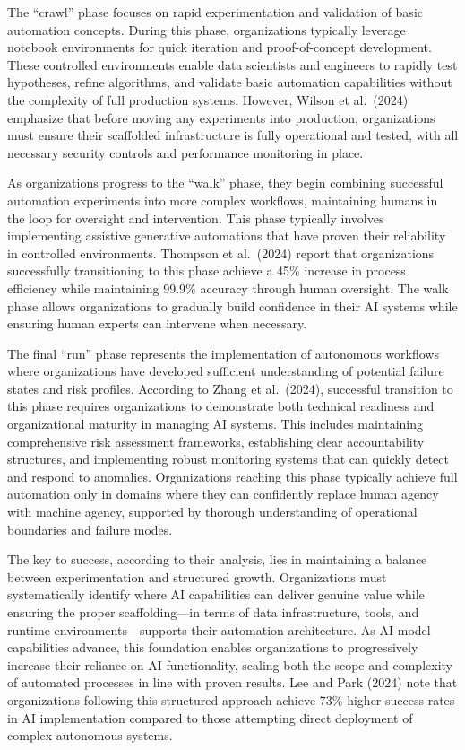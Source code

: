 \documentclass[
]{article}
\begin{document}
The ``crawl'' phase focuses on rapid experimentation and validation of
basic automation concepts. During this phase, organizations typically
leverage notebook environments for quick iteration and proof-of-concept
development. These controlled environments enable data scientists and
engineers to rapidly test hypotheses, refine algorithms, and validate
basic automation capabilities without the complexity of full production
systems. However, Wilson et al.~(2024) emphasize that before moving any
experiments into production, organizations must ensure their scaffolded
infrastructure is fully operational and tested, with all necessary
security controls and performance monitoring in place.

As organizations progress to the ``walk'' phase, they begin combining
successful automation experiments into more complex workflows,
maintaining humans in the loop for oversight and intervention. This
phase typically involves implementing assistive generative automations
that have proven their reliability in controlled environments. Thompson
et al.~(2024) report that organizations successfully transitioning to
this phase achieve a 45\% increase in process efficiency while
maintaining 99.9\% accuracy through human oversight. The walk phase
allows organizations to gradually build confidence in their AI systems
while ensuring human experts can intervene when necessary.

The final ``run'' phase represents the implementation of autonomous
workflows where organizations have developed sufficient understanding of
potential failure states and risk profiles. According to Zhang et
al.~(2024), successful transition to this phase requires organizations
to demonstrate both technical readiness and organizational maturity in
managing AI systems. This includes maintaining comprehensive risk
assessment frameworks, establishing clear accountability structures, and
implementing robust monitoring systems that can quickly detect and
respond to anomalies. Organizations reaching this phase typically
achieve full automation only in domains where they can confidently
replace human agency with machine agency, supported by thorough
understanding of operational boundaries and failure modes.

The key to success, according to their analysis, lies in maintaining a
balance between experimentation and structured growth. Organizations
must systematically identify where AI capabilities can deliver genuine
value while ensuring the proper scaffolding---in terms of data
infrastructure, tools, and runtime environments---supports their
automation architecture. As AI model capabilities advance, this
foundation enables organizations to progressively increase their
reliance on AI functionality, scaling both the scope and complexity of
automated processes in line with proven results. Lee and Park (2024)
note that organizations following this structured approach achieve 73\%
higher success rates in AI implementation compared to those attempting
direct deployment of complex autonomous systems.
\end{document}
